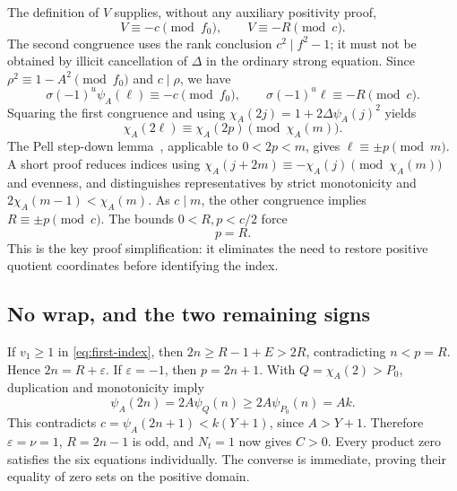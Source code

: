 \documentclass[11pt,a4paper]{article}
\theoremstyle{remark}\newtheorem{remark}[theorem]{Remark}
\begin{document}
The definition of $V$ supplies, without any auxiliary positivity proof,
\[
 V\equiv-c\pmod{f_0},\qquad V\equiv-R\pmod c.
\]
The second congruence uses the rank conclusion $c^2\mid f^2-1$;
it must not be obtained by illicit cancellation of $\Delta$ in the
ordinary strong equation. Since $\rho^2\equiv1-A^2\pmod{f_0}$
and $c\mid\rho$, we have
\[
 \sigma(-1)^u\psi_A(\ell)\equiv-c\pmod{f_0},\qquad
 \sigma(-1)^u\ell\equiv-R\pmod c.
\]
Squaring the first congruence and using
$\chi_A(2j)=1+2\Delta\psi_A(j)^2$ yields
\[
 \chi_A(2\ell)\equiv\chi_A(2p)\pmod{\chi_A(m)}.
\]
The Pell step-down lemma~\cite{stepdown}, applicable to $0<2p<m$,
gives $\ell\equiv\pm p\pmod m$. A short proof reduces indices
using $\chi_A(j+2m)\equiv-\chi_A(j)\pmod{\chi_A(m)}$ and
evenness, and distinguishes representatives by strict monotonicity
and $2\chi_A(m-1)<\chi_A(m)$.
As $c\mid m$, the other congruence implies $R\equiv\pm p\pmod c$.
The bounds $0<R,p<c/2$ force
\[
 \boxed{p=R.}
\]
This is the key proof simplification: it eliminates the need to restore
positive quotient coordinates before identifying the index.

\subsection{No wrap, and the two remaining signs}
If $v_1\ge1$ in \eqref{eq:first-index}, then
$2n\ge R-1+E>2R$, contradicting $n<p=R$.
Hence $2n=R+\varepsilon$. If $\varepsilon=-1$, then $p=2n+1$.
With $Q=\chi_A(2)>P_0$, duplication and monotonicity imply
\[
 \psi_A(2n)=2A\psi_Q(n)\ge2A\psi_{P_0}(n)=Ak.
\]
This contradicts $c=\psi_A(2n+1)<k(Y+1)$, since $A>Y+1$.
Therefore $\varepsilon=\nu=1$, $R=2n-1$ is odd, and
$N_t=1$ now gives $C>0$. Every product zero satisfies the six
equations individually. The converse is immediate, proving their
equality of zero sets on the positive domain.
\end{document}
